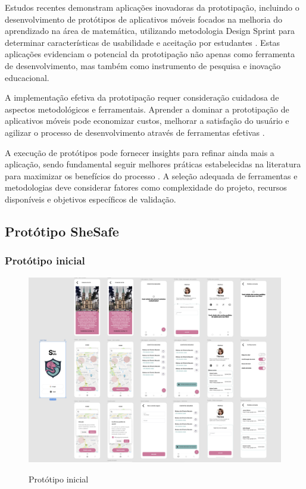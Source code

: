 Estudos recentes demonstram aplicações inovadoras da prototipação, incluindo o desenvolvimento de protótipos de aplicativos móveis focados na melhoria do aprendizado na área de matemática, utilizando metodologia Design Sprint para determinar características de usabilidade e aceitação por estudantes \cite{salud_ciencia_prototyping}. Estas aplicações evidenciam o potencial da prototipação não apenas como ferramenta de desenvolvimento, mas também como instrumento de pesquisa e inovação educacional.

A implementação efetiva da prototipação requer consideração cuidadosa de aspectos metodológicos e ferramentais. Aprender a dominar a prototipação de aplicativos móveis pode economizar custos, melhorar a satisfação do usuário e agilizar o processo de desenvolvimento através de ferramentas efetivas \cite{decode_best_practices}.

A execução de protótipos pode fornecer insights para refinar ainda mais a aplicação, sendo fundamental seguir melhores práticas estabelecidas na literatura para maximizar os benefícios do processo \cite{ossisto_guide}. A seleção adequada de ferramentas e metodologias deve considerar fatores como complexidade do projeto, recursos disponíveis e objetivos específicos de validação.


\subsection{Protótipo SheSafe}

\subsubsection{Protótipo inicial}
\begin{figure}[h]
	\begin{center}
		\includegraphics[width=0.8\linewidth]{images/prototipo-inicial.png}\\
	\end{center}
	\caption[Protótipo inicial]{Protótipo inicial}
	\label{fig:prototipo-inicial}
\end{figure}
\pagebreak

